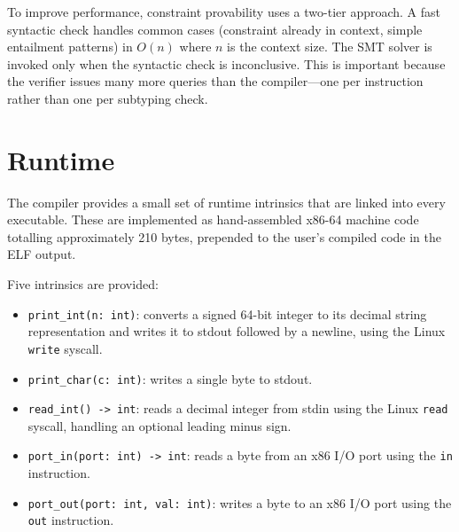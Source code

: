 To improve performance, constraint provability uses a two-tier approach. A fast syntactic check handles common cases (constraint already in context, simple entailment patterns) in $O(n)$ where $n$ is the context size. The SMT solver is invoked only when the syntactic check is inconclusive. This is important because the verifier issues many more queries than the compiler---one per instruction rather than one per subtyping check.

%
%

\section{Runtime}\label{sec:runtime}

The compiler provides a small set of runtime intrinsics that are linked into every executable. These are implemented as hand-assembled x86-64 machine code totalling approximately 210 bytes, prepended to the user's compiled code in the ELF output.

Five intrinsics are provided:

\begin{itemize}
  \item \texttt{print\_int(n: int)}: converts a signed 64-bit integer to its decimal string representation and writes it to stdout followed by a newline, using the Linux \texttt{write} syscall.
  \item \texttt{print\_char(c: int)}: writes a single byte to stdout.
  \item \texttt{read\_int() -> int}: reads a decimal integer from stdin using the Linux \texttt{read} syscall, handling an optional leading minus sign.
  \item \texttt{port\_in(port: int) -> int}: reads a byte from an x86 I/O port using the \texttt{in} instruction.
  \item \texttt{port\_out(port: int, val: int)}: writes a byte to an x86 I/O port using the \texttt{out} instruction.
\end{itemize}

